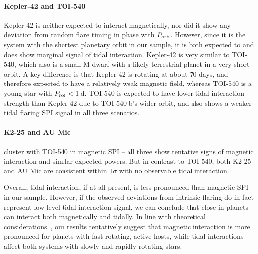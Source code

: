\documentclass[twocolumn]{aastex631}
\begin{document}
\paragraph{Kepler-42 and TOI-540} Kepler-42 is neither expected to interact magnetically, nor did it show any deviation from random flare timing in phase with $P_{\rm orb}$. However, since it is the system with the shortest planetary orbit in our sample, it is both expected to and does show marginal signal of tidal interaction. Kepler-42 is very similar to TOI-540, which also is a small M dwarf with a likely terrestrial planet in a very short orbit. A key difference is that Kepler-42 is rotating at about 70 days, and therefore expected to have a relatively weak magnetic field, whereas TOI-540 is a young star with $P_{\rm rot}<1\,$d. TOI-540 is expected to have lower tidal interaction strength than Kepler-42 due to TOI-540 b's wider orbit, and also shows a weaker tidal flaring SPI signal in all three scenarios. 

\paragraph{K2-25 and AU Mic} cluster with TOI-540 in magnetic SPI -- all three show tentative signs of magnetic interaction and similar expected powers. But in contrast to TOI-540, both K2-25 and AU Mic are consistent within $1\sigma$ with no observable tidal interaction.

Overall, tidal interaction, if at all present, is less pronounced than magnetic SPI in our sample. However, if the observed deviations from intrinsic flaring do in fact represent low level tidal interaction signal, we can conclude that close-in planets can interact both magnetically and tidally. In line with theoretical considerations~\citep{strugarek2017fate}, our results tentatively suggest that magnetic interaction is more pronounced for planets with fast rotating, active hosts, while tidal interactions affect both systems with slowly and rapidly rotating stars.

\end{document}
